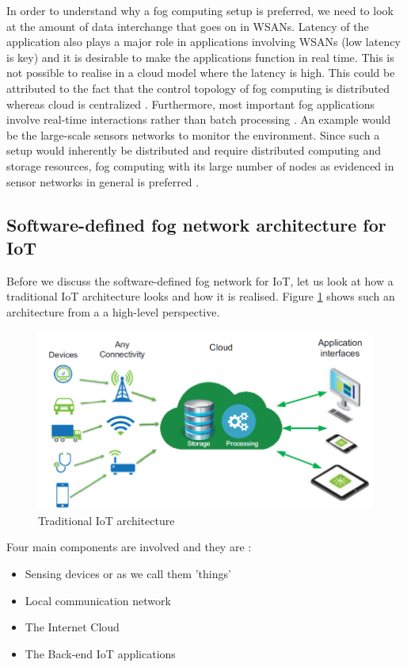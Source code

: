 \documentclass{article}
\begin{document}
In order to understand why a fog computing setup is preferred, we need to look at the amount of data interchange that goes on in WSANs.
Latency of the application also plays a major role in applications involving WSANs (low latency is key) and it is desirable to make the applications function in real time.
This is not possible to realise in a cloud model where the latency is high. This could be attributed to the fact that the control topology of fog computing is distributed whereas cloud is centralized \cite{lee2016gateway}.
Furthermore, most important fog applications involve real-time interactions rather than batch processing \cite{lee2016gateway}. 
An example would be the large-scale sensors networks to monitor the environment. Since such a setup would inherently be distributed and require distributed computing and storage resources, fog computing with its large number of nodes as evidenced in sensor networks in general is preferred \cite{lee2016gateway}. 


\subsection{Software-defined fog network architecture for IoT}

Before we discuss the software-defined fog network for IoT, let us look at how a traditional IoT architecture looks and how it is realised.
Figure \ref{fig:iot} shows such an architecture from a a high-level perspective.

\begin{figure}[H]
	\centering
	\includegraphics[scale=0.5]{iot.png}
	\caption{Traditional IoT architecture \cite{tomovic2017software}}
	\label{fig:iot}
\end{figure} 

Four main components are involved and they are \cite{tomovic2017software}: 
\begin{itemize}
	\item Sensing devices or as we call them 'things'
	\item Local communication network
	\item The Internet Cloud
	\item The Back-end IoT applications
\end{itemize}
\end{document}
